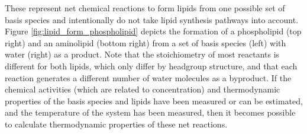 These represent net chemical reactions to form lipids from one possible set of basis species and intentionally do not take lipid synthesis pathways into account. Figure \ref{fig:lipid_form_phospholipid} depicts the formation of a phospholipid (top right) and an aminolipid (bottom right) from a set of basis species (left) with water (right) as a product. Note that the stoichiometry of most reactants is different for both lipids, which only differ by headgroup structure, and that each reaction generates a different number of water molecules as a byproduct. If the chemical activities (which are related to concentration) and thermodynamic properties of the basis species and lipids have been measured or can be estimated, and the temperature of the system has been measured, then it becomes possible to calculate thermodynamic properties of these net reactions.

